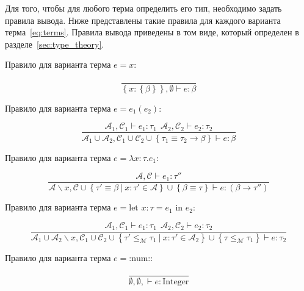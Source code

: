 Для того, чтобы для любого терма определить его тип, необходимо задать правила вывода.
Ниже представлены такие правила для каждого варианта терма~\eqref{eq:terms}.
Правила вывода приведены в том виде, который определен в разделе~\ref{sec:type_theory}.

Правило для варианта терма $e = x$:

\begin{equation}
    \label{eq:var_infer}
    \frac{}{\left\{ x: \left\{ \beta \right\} \right\}, \emptyset \vdash e: \beta}
\end{equation}

Правило для варианта терма $e = e_1(e_2)$:

\begin{equation}
    \label{eq:app_infer}
    \frac{
        \mathcal{A}_1, \mathcal{C}_1 \vdash e_1: \tau_1 ~~ \mathcal{A}_2, \mathcal{C}_2 \vdash e_2: \tau_2
    }{
        \mathcal{A}_1 \cup \mathcal{A}_2, \mathcal{C}_1 \cup \mathcal{C}_2 \cup \left\{ \tau_1 \equiv \tau_2 \to \beta \right\} \vdash e: \beta
    }
\end{equation}

Правило для варианта терма $e = \lambda x: \tau. e_1$:

\begin{equation}
    \label{eq:abs_infer}
    \frac{
        \mathcal{A}, \mathcal{C} \vdash e_1: \tau''
    }{
        \mathcal{A} \backslash x, \mathcal{C} \cup \left\{ \tau' \equiv \beta ~|~ x: \tau' \in \mathcal{A} \right\} \cup \left\{ \beta \equiv \tau \right\} \vdash e: (\beta \to \tau'')
    }
\end{equation}

Правило для варианта терма $e = \text{let } x: \tau = e_1 \text{ in } e_2$:

\begin{equation}
    \label{eq:let_infer}
    \frac{
        \mathcal{A}_1, \mathcal{C}_1 \vdash e_1: \tau_1 ~~ \mathcal{A}_2, \mathcal{C}_2 \vdash e_2: \tau_2
    }{
        \mathcal{A}_1 \cup \mathcal{A}_2 \backslash x, \mathcal{C}_1 \cup \mathcal{C}_2 \cup \left\{ \tau' \leq_{\mathcal{M}} \tau_1 ~|~ x: \tau' \in \mathcal{A}_2 \right\} \cup \left\{ \tau \leq_{\mathcal{M}} \tau_1 \right\} \vdash e: \tau_2
    }
\end{equation}

Правило для варианта терма $e = \text{:num:}$:

\begin{equation}
    \label{eq:num_infer}
    \frac{}{\emptyset, \emptyset, \vdash e: \text{Integer}}
\end{equation}


